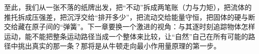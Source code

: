 至此，我们从一张不落的纸牌出发，把“不动”拆成两笔账（力与力矩），把流体的推托拆成压强差，把沉浮交给“排开多少”，把流动交给能量守恒，把固体的硬与断交给藏在原子间的“弹簧”。下一章要换一个激进的视角：与其逐时刻追踪物体怎样运动，能不能把整条运动路径当成一个整体来比较，让“自然”自己在所有可能的路径中挑出真实的那一条？那将是从牛顿走向最小作用量原理的第一步。

